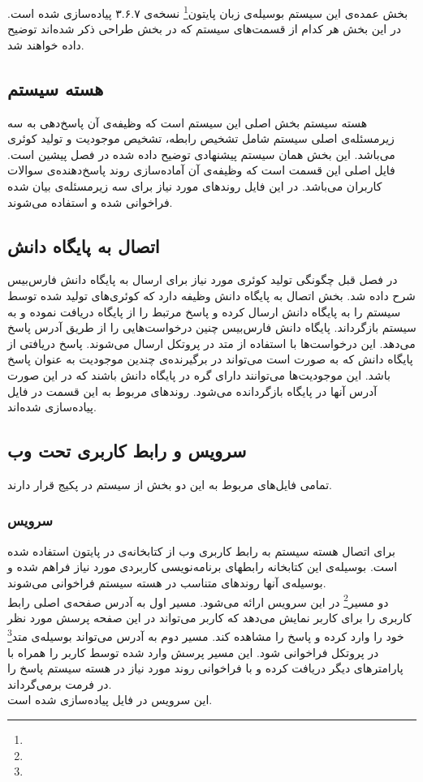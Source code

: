 بخش عمده‌ی این سیستم بوسیله‌ی زبان پایتون\footnote{} نسخه‌ی ۳.۶.۷ پیاده‌سازی شده است. در این بخش هر کدام از قسمت‌های سیستم که در بخش طراحی ذکر شده‌اند توضیح داده خواهند شد.

\subsection{هسته سیستم}
هسته سیستم بخش اصلی این سیستم است که وظیفه‌ی آن پاسخ‌دهی به سه زیرمسئله‌ی اصلی سیستم شامل تشخیص رابطه، تشخیص موجودیت و تولید کوئری می‌باشد. این بخش همان سیستم پیشنهادی توضیح داده شده در فصل پیشین است.
فایل اصلی این قسمت  است که وظیفه‌ی آن آماده‌سازی روند پاسخ‌دهنده‌ی سوالات کاربران می‌باشد. در این فایل روندهای مورد نیاز برای سه زیرمسئله‌ی بیان شده فراخوانی شده و استفاده می‌شوند.
\subsection{اتصال به پایگاه دانش}
در فصل قبل چگونگی تولید کوئری مورد نیاز برای ارسال به پایگاه دانش فارس‌بیس شرح داده شد. بخش اتصال به پایگاه دانش وظیفه دارد که کوئری‌های تولید شده توسط سیستم را به پایگاه دانش ارسال کرده و پاسخ مرتبط را از پایگاه دریافت نموده و به سیستم بازگرداند. پایگاه دانش فارس‌بیس چنین درخواست‌هایی را از طریق آدرس  پاسخ می‌دهد. این درخواست‌ها با استفاده از متد  در پروتکل  ارسال می‌شوند. پاسخ دریافتی از پایگاه دانش که به صورت  است می‌تواند در برگیرنده‌ی چندین موجودیت به عنوان پاسخ باشد. این موجودیت‌ها می‌توانند دارای گره در پایگاه دانش باشند که در این صورت آدرس آنها در پایگاه بازگردانده می‌شود.
روندهای مربوط به این قسمت در فایل  پیاده‌سازی شده‌اند.
\subsection{سرویس و رابط کاربری تحت وب}
تمامی فایل‌های مربوط به این دو بخش از سیستم در پکیج  قرار دارند.
\subsubsection{سرویس}
برای اتصال هسته سیستم به رابط کاربری وب از کتابخانه‌ی  در پایتون استفاده شده است. بوسیله‌ی این کتابخانه رابطهای برنامه‌نویسی کاربردی مورد نیاز فراهم شده و بوسیله‌ی آنها روندهای متناسب در هسته سیستم فراخوانی می‌شوند.\\
دو مسیر\footnote{} در این سرویس ارائه می‌شود. مسیر اول به آدرس  صفحه‌ی اصلی رابط کاربری را برای کاربر نمایش می‌دهد که کاربر می‌تواند در این صفحه پرسش مورد نظر خود را وارد کرده و پاسخ را مشاهده کند. مسیر دوم به آدرس  می‌تواند بوسیله‌ی متد\footnote{}  در پروتکل  فراخوانی شود. این مسیر پرسش وارد شده توسط کاربر را همراه با پارامترهای دیگر دریافت کرده و با فراخوانی روند مورد نیاز در هسته سیستم پاسخ را در فرمت  برمی‌گرداند.\\
این سرویس در فایل  پیاده‌سازی شده است.
